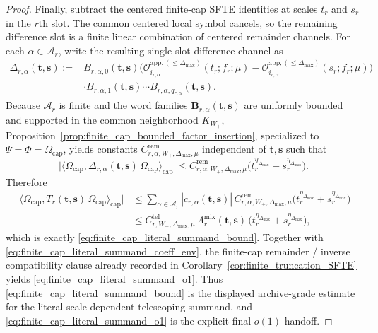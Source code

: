 \begin{proof}
Finally, subtract the centered finite-cap SFTE identities at scales $t_r$ and $s_r$ in the $r$th slot.
The common centered local symbol cancels, so the remaining difference slot is a finite linear combination of centered remainder channels.
For each $\alpha\in\mathcal A_r$, write the resulting single-slot difference channel as
\[
\begin{aligned}
\Delta_{r,\alpha}(\mathbf t,\mathbf s)
:={}&
B_{r,\alpha,0}(\mathbf t,\mathbf s)
\bigl(
\mathcal O_{i_{r,\alpha}}^{\mathrm{app},(\le \Delta_{\max})}(t_r;f_r;\mu)
-
\mathcal O_{i_{r,\alpha}}^{\mathrm{app},(\le \Delta_{\max})}(s_r;f_r;\mu)
\bigr)\\
&\cdot
B_{r,\alpha,1}(\mathbf t,\mathbf s)\cdots B_{r,\alpha,q_{r,\alpha}}(\mathbf t,\mathbf s).
\end{aligned}
\]
Because $\mathcal A_r$ is finite and the word families $\mathbf B_{r,\alpha}(\mathbf t,\mathbf s)$ are uniformly bounded and supported in the common neighborhood $K_{W_+}$, Proposition~\ref{prop:finite_cap_bounded_factor_insertion}, specialized to $\Psi=\Phi=\Omega_{\mathrm{cap}}$, yields constants $C^{\mathrm{rem}}_{r,\alpha,W_+,\Delta_{\max},\mu}$ independent of $\mathbf t,\mathbf s$ such that
\[
\Big|
\big\langle \Omega_{\mathrm{cap}},\Delta_{r,\alpha}(\mathbf t,\mathbf s)\,\Omega_{\mathrm{cap}}\big\rangle_{\mathrm{cap}}
\Big|
\le
C^{\mathrm{rem}}_{r,\alpha,W_+,\Delta_{\max},\mu}
\bigl(t_r^{\eta_{\Delta_{\max}}}+s_r^{\eta_{\Delta_{\max}}}\bigr).
\]
Therefore
\[
\begin{aligned}
\Big|
\big\langle \Omega_{\mathrm{cap}},T_r(\mathbf t,\mathbf s)\,\Omega_{\mathrm{cap}}\big\rangle_{\mathrm{cap}}
\Big|
&\le
\sum_{\alpha\in\mathcal A_r}
|c_{r,\alpha}(\mathbf t,\mathbf s)|\,
C^{\mathrm{rem}}_{r,\alpha,W_+,\Delta_{\max},\mu}
\bigl(t_r^{\eta_{\Delta_{\max}}}+s_r^{\eta_{\Delta_{\max}}}\bigr)\\
&\le
C^{\mathrm{tel}}_{r,W_+,\Delta_{\max},\mu}\,
\Lambda^{\mathrm{mix}}_{r}(\mathbf t,\mathbf s)\,
\bigl(t_r^{\eta_{\Delta_{\max}}}+s_r^{\eta_{\Delta_{\max}}}\bigr),
\end{aligned}
\]
which is exactly \eqref{eq:finite_cap_literal_summand_bound}.
Together with \eqref{eq:finite_cap_literal_summand_coeff_env}, the finite-cap remainder / inverse compatibility clause already recorded in Corollary~\ref{cor:finite_truncation_SFTE} yields \eqref{eq:finite_cap_literal_summand_o1}.
Thus \eqref{eq:finite_cap_literal_summand_bound} is the displayed archive-grade estimate for the literal scale-dependent telescoping summand, and \eqref{eq:finite_cap_literal_summand_o1} is the explicit final $o(1)$ handoff.
\end{proof}


